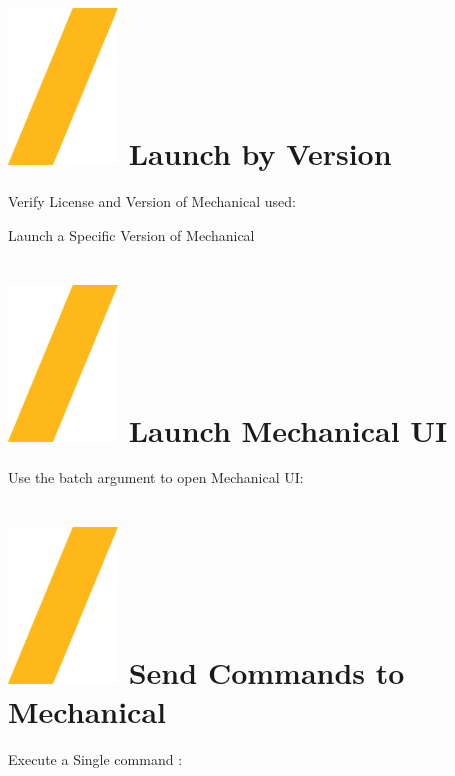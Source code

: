 \documentclass[9pt,landscape]{article}
\begin{document}
\begin{multicols}{3}
\section{\includegraphics[height=\fontcharht\font`\S]{slash.png} Launch by Version}

Verify License and Version of Mechanical used:


Launch a Specific Version of Mechanical






\section{\includegraphics[height=\fontcharht\font`\S]{slash.png} Launch  Mechanical UI}

Use the batch argument to open Mechanical UI:


\vfill

\section{\includegraphics[height=\fontcharht\font`\S]{slash.png} Send Commands to Mechanical}
Execute a Single command :


\end{multicols}
\end{document}
